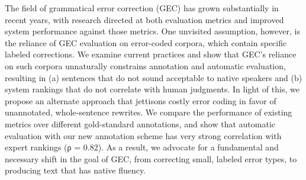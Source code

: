 The field of grammatical error correction (GEC) has grown substantially in recent years, with research directed at both evaluation metrics and improved system performance against those metrics. One unvisited assumption, however, is the reliance of GEC evaluation on error-coded corpora, which contain specific labeled corrections. We examine current practices and show that GEC's reliance on such corpora unnaturally constrains annotation and automatic evaluation, resulting in (a) sentences that do not sound acceptable to native speakers and (b) system rankings that do not correlate with human judgments. In light of this, we propose an alternate approach that jettisons costly error coding in favor of unannotated, whole-sentence rewrites. We compare the performance of existing metrics over different gold-standard annotations, and show that automatic evaluation with our new annotation scheme has very strong correlation with expert rankings (ρ = 0.82). As a result, we advocate for a fundamental and necessary shift in the goal of GEC, from correcting small, labeled error types, to producing text that has native fluency.
